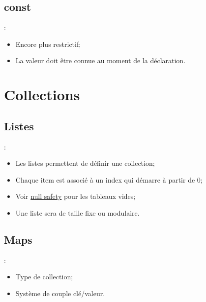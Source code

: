 \documentclass[10pt]{beamer}
\begin{document}
\subsection{const}
\begin{frame}[fragile,t]{\secname : \subsecname}
    \begin{itemize}
        \item Encore plus restrictif;
        \item La valeur doit être connue au moment de la déclaration.
    \end{itemize}
    
\end{frame}

\section{Collections}
\subsection{Listes}
\begin{frame}[fragile,t]{\secname : \subsecname}
    \begin{itemize}
        \item Les listes permettent de définir une collection;
        \item Chaque item est associé à un index qui démarre à partir de 0;
        \item Voir \href{https://dart.dev/null-safety}{null safety} pour les tableaux vides;
        \item Une liste sera de taille fixe ou modulaire.
    \end{itemize}
    
\end{frame}

\subsection{Maps}
\begin{frame}[fragile,t]{\secname : \subsecname}
    \begin{itemize}
        \item Type de collection;
        \item Système de couple clé/valeur.
    \end{itemize}
    
\end{frame}
\end{document}

